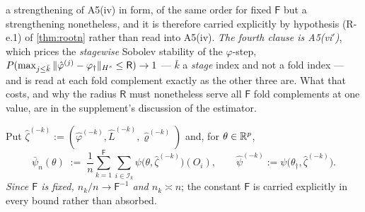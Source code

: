 \begin{definition}
\begin{enumerate}
{a strengthening of A5(iv) in form}, of the same order for fixed $\mathsf F$ but a strengthening
nonetheless, and it is therefore carried explicitly by hypothesis (R-e.1) of \cref{thm:rootn} rather
than read into A5(iv).
\emph{The fourth clause is A5(vi$'$)}, which prices the \emph{stagewise} Sobolev stability of the
$\varphi$-step,
$P(\max_{j\le\bar k}\|\hat\varphi^{(j)}-\varphi_{\dagger}\|_{H^{s}}\le\mathsf R)\to1$ --- $\bar k$ a
\emph{stage} index and not a fold index --- and is read at each fold complement exactly as the other
three are. What that costs, and why the radius $\mathsf R$ must nonetheless serve all $\mathsf F$ fold
complements at one value, are in the supplement's discussion of the estimator.
\end{enumerate}
Put $\hat\zeta^{(-k)}:=(\hat\varphi^{(-k)},\hat L^{(-k)},\hat\varrho^{(-k)})$ and, for $\theta\in\mathbb{R}^{p}$,
\begin{equation}\label{eq:barpsi}
\bar\psi_n(\theta)\;:=\;\frac1n\sum_{k=1}^{\mathsf F}\sum_{i\in\mathcal I_k}\psi\big(\theta,\hat\zeta^{(-k)}\big)(O_i),
\qquad
\hat\psi^{(-k)}:=\psi\big(\theta_\dagger,\hat\zeta^{(-k)}\big).
\end{equation}
\emph{Since $\mathsf F$ is fixed, $n_k/n\to\mathsf F^{-1}$ and $n_k\asymp n$}; the constant $\mathsf F$
is carried explicitly in every bound rather than absorbed.
\end{definition}

